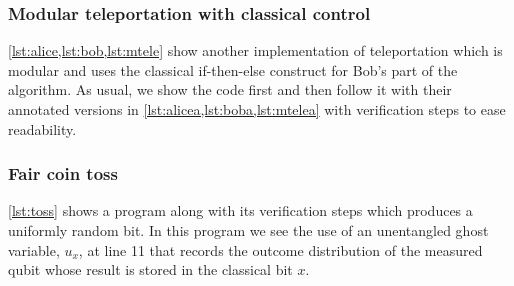 \documentclass[adraft,creativecommons]{eptcs}
\theoremstyle{definition}
\theoremstyle{remark}
\begin{document}
\subsubsection{Modular teleportation with classical control}

\cref{lst:alice,lst:bob,lst:mtele} show another implementation of teleportation which is modular and uses the classical if-then-else construct for Bob's part of the algorithm. As usual, we show the code first and then follow it with their annotated versions in \cref{lst:alicea,lst:boba,lst:mtelea} with verification steps to ease readability.













\subsubsection{Fair coin toss}

\cref{lst:toss} shows a program along with its verification steps which produces a uniformly random bit. In this program we see the use of an unentangled ghost variable, $u_x$, at line 11 that records the outcome distribution of the measured qubit whose result is stored in the classical bit $x$.


\end{document}
